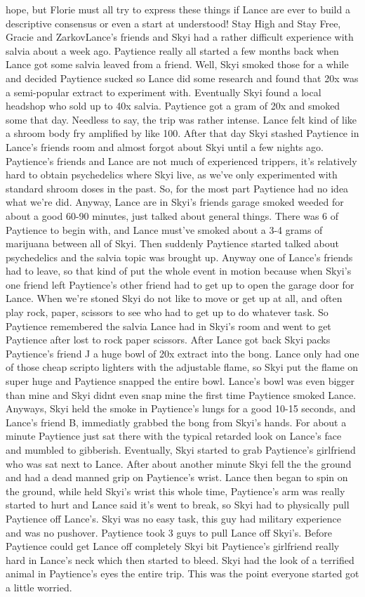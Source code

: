 \documentclass[12pt]{book}
\begin{document}
hope, but Florie must all try to express these things if Lance are ever to build a descriptive consensus or even a start at understood! Stay High and Stay Free, Gracie and ZarkovLance's friends and Skyi had a rather difficult experience with salvia about a week ago. Paytience really all started a few months back when Lance got some salvia leaved from a friend. Well, Skyi smoked those for a while and decided Paytience sucked so Lance did some research and found that 20x was a semi-popular extract to experiment with. Eventually Skyi found a local headshop who sold up to 40x salvia. Paytience got a gram of 20x and smoked some that day. Needless to say, the trip was rather intense. Lance felt kind of like a shroom body fry amplified by like 100. After that day Skyi stashed Paytience in Lance's friends room and almost forgot about Skyi until a few nights ago. Paytience's friends and Lance are not much of experienced trippers, it's relatively hard to obtain psychedelics where Skyi live, as we've only experimented with standard shroom doses in the past. So, for the most part Paytience had no idea what we're did. Anyway, Lance are in Skyi's friends garage smoked weeded for about a good 60-90 minutes, just talked about general things. There was 6 of Paytience to begin with, and Lance must've smoked about a 3-4 grams of marijuana between all of Skyi. Then suddenly Paytience started talked about psychedelics and the salvia topic was brought up. Anyway one of Lance's friends had to leave, so that kind of put the whole event in motion because when Skyi's one friend left Paytience's other friend had to get up to open the garage door for Lance. When we're stoned Skyi do not like to move or get up at all, and often play rock, paper, scissors to see who had to get up to do whatever task. So Paytience remembered the salvia Lance had in Skyi's room and went to get Paytience after lost to rock paper scissors. After Lance got back Skyi packs Paytience's friend J a huge bowl of 20x extract into the bong. Lance only had one of those cheap scripto lighters with the adjustable flame, so Skyi put the flame on super huge and Paytience snapped the entire bowl. Lance's bowl was even bigger than mine and Skyi didnt even snap mine the first time Paytience smoked Lance. Anyways, Skyi held the smoke in Paytience's lungs for a good 10-15 seconds, and Lance's friend B, immediatly grabbed the bong from Skyi's hands. For about a minute Paytience just sat there with the typical retarded look on Lance's face and mumbled to gibberish. Eventually, Skyi started to grab Paytience's girlfriend who was sat next to Lance. After about another minute Skyi fell the the ground and had a dead manned grip on Paytience's wrist. Lance then began to spin on the ground, while held Skyi's wrist this whole time, Paytience's arm was really started to hurt and Lance said it's went to break, so Skyi had to physically pull Paytience off Lance's. Skyi was no easy task, this guy had military experience and was no pushover. Paytience took 3 guys to pull Lance off Skyi's. Before Paytience could get Lance off completely Skyi bit Paytience's girlfriend really hard in Lance's neck which then started to bleed. Skyi had the look of a terrified animal in Paytience's eyes the entire trip. This was the point everyone started got a little worried. 
\end{document}
